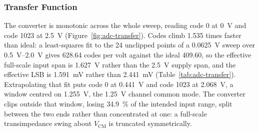 %

\subsubsection{Transfer Function}\label{sss:adc-transfer}

The converter is monotonic across the whole sweep, reading code 0 at
\SI{0}{\volt} and code 1023 at \SI{2.5}{\volt} (Figure~\ref{fig:adc-transfer}).
Codes climb 1.535 times faster than ideal: a least-squares fit to the 24
unclipped points of a \SI{0.0625}{\volt} sweep over \SIrange{0.5}{2.0}{\volt} gives \num{628.64} codes per
volt against the ideal \num{409.60}, so the effective full-scale input span is
\SI{1.627}{\volt} rather than the \SI{2.5}{\volt} supply span, and the effective
LSB is \SI{1.591}{\milli\volt} rather than \SI{2.441}{\milli\volt}
(Table~\ref{tab:adc-transfer}). Extrapolating that fit puts code 0 at
\SI{0.441}{\volt} and code 1023 at \SI{2.068}{\volt}, a window centred on
\SI{1.255}{\volt}, the \SI{1.25}{\volt} channel common mode. The converter
clips outside that window, losing \SI{34.9}{\percent} of the intended input
range, split between the two ends rather than concentrated at one: a
full-scale transimpedance swing about $V_{\mathrm{CM}}$ is truncated
symmetrically.

